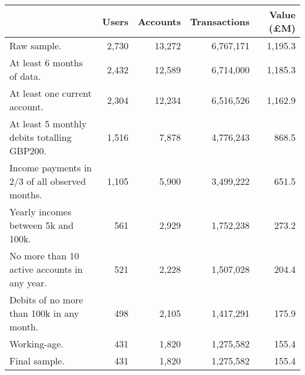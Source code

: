 \begin{tabular}{lrrrr}
\toprule
                                               & Users & Accounts & Transactions & Value (\pounds M) \\
\midrule
                                   Raw sample. & 2,730 &   13,272 &    6,767,171 &           1,195.3 \\
                    At least 6 months of data. & 2,432 &   12,589 &    6,714,000 &           1,185.3 \\
                 At least one current account. & 2,304 &   12,234 &    6,516,526 &           1,162.9 \\
   At least 5 monthly debits totalling GBP200. & 1,516 &    7,878 &    4,776,243 &             868.5 \\
Income payments in 2/3 of all observed months. & 1,105 &    5,900 &    3,499,222 &             651.5 \\
           Yearly incomes between 5k and 100k. &   561 &    2,929 &    1,752,238 &             273.2 \\
  No more than 10 active accounts in any year. &   521 &    2,228 &    1,507,028 &             204.4 \\
     Debits of no more than 100k in any month. &   498 &    2,105 &    1,417,291 &             175.9 \\
                                  Working-age. &   431 &    1,820 &    1,275,582 &             155.4 \\
                                 Final sample. &   431 &    1,820 &    1,275,582 &             155.4 \\
\bottomrule
\end{tabular}
